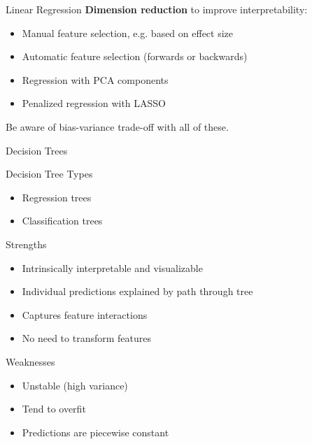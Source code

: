 \documentclass[ignorenonframetext,xcolor=x11names]{beamer}
\begin{document}
\begin{frame}[label=full,fragile]{Linear Regression}
\textbf{Dimension reduction} to improve interpretability:
\begin{itemize}
   \item Manual feature selection, e.g. based on effect size
   \item Automatic feature selection (forwards or backwards)
   \item Regression with PCA components
   \item Penalized regression with LASSO
\end{itemize} 

Be aware of bias-variance trade-off with all of these. \\

\end{frame}


\begin{frame}[label=full]{Decision Trees}

\begin{block}{Decision Tree Types}
\begin{itemize}
\item Regression trees
\item Classification trees
\end{itemize}
\end{block}

\begin{block}{Strengths}
\begin{itemize}
   \item Intrinsically interpretable and visualizable
   \item Individual predictions explained by path through tree
   \item Captures feature interactions
   \item No need to transform features
\end{itemize}
\end{block}

\begin{block}{Weaknesses}
\begin{itemize}
   \item Unstable (high variance)
   \item Tend to overfit
   \item Predictions are piecewise constant
\end{itemize}
\end{block}

\end{frame}
\end{document}
